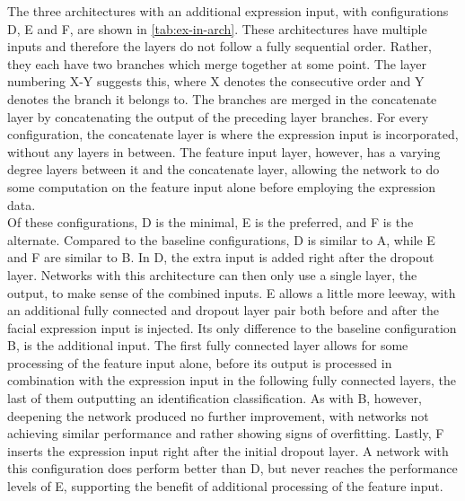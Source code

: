 The three architectures with an additional expression input, with configurations D, E and F, are shown in \autoref{tab:ex-in-arch}. These architectures have multiple inputs and therefore the layers do not follow a fully sequential order. Rather, they each have two branches which merge together at some point. The layer numbering X-Y suggests this, where X denotes the consecutive order and Y denotes the branch it belongs to. The branches are merged in the concatenate layer by concatenating the output of the preceding layer branches. For every configuration, the concatenate layer is where the expression input is incorporated, without any layers in between. The feature input layer, however, has a varying degree layers between it and the concatenate layer, allowing the network to do some computation on the feature input alone before employing the expression data. \\

\noindent Of these configurations, D is the minimal, E is the preferred, and F is the alternate. Compared to the baseline configurations, D is similar to A, while E and F are similar to B. In D, the extra input is added right after the dropout layer. Networks with this architecture can then only use a single layer, the output, to make sense of the combined inputs. E allows a little more leeway, with an additional fully connected and dropout layer pair both before and after the facial expression input is injected. Its only difference to the baseline configuration B, is the additional input. The first fully connected layer allows for some processing of the feature input alone, before its output is processed in combination with the expression input in the following fully connected layers, the last of them outputting an identification classification. As with B, however, deepening the network produced no further improvement, with networks not achieving similar performance and rather showing signs of overfitting. Lastly, F inserts the expression input right after the initial dropout layer. A network with this configuration does perform better than D, but never reaches the performance levels of E, supporting the benefit of additional processing of the feature input. 

